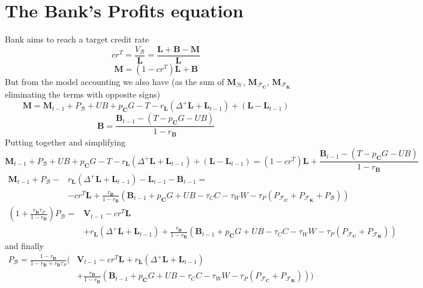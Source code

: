 \chapter{The Bank's Profits equation}
\label{app:eq}
Bank aims to reach a target credit rate
$${cr}^T = \frac{V_\mathcal{B}}{\mathbf{L}} = \frac{\mathbf{L} + \mathbf{B} - \mathbf{M}}{\mathbf{L}}$$
$$\mathbf{M} = (1-{cr}^T) \mathbf{L} + \mathbf{B}$$
But from the model accounting we also have (as the sum of $\mathbf{M}_\mathcal{H}$, $\mathbf{M}_{\mathcal{F}_\mathbf{C}}$, $\mathbf{M}_{\mathcal{F}_\mathbf{K}}$ eliminating the terms with opposite signs)
$$\mathbf{M} = \mathbf{M}_{t-1} + P_\mathcal{B} + UB + p_\mathbf{C} G - T -r_\mathbf{L}(\Delta^+\mathbf{L} + \mathbf{L}_{t-1}) + (\mathbf{L} - \mathbf{L}_{t-1})$$
$$\mathbf{B} = \frac{\mathbf{B}_{t-1} - (T - p_\mathbf{C}G - UB)}{1-r_\mathbf{B}}$$
Putting together and simplifying
$$\mathbf{M}_{t-1} + P_\mathcal{B} + UB + p_\mathbf{C} G - T -r_\mathbf{L}(\Delta^+\mathbf{L} + \mathbf{L}_{t-1}) + (\mathbf{L} - \mathbf{L}_{t-1}) = (1-{cr}^T) \mathbf{L} + \frac{\mathbf{B}_{t-1} - (T - p_\mathbf{C}G - UB)}{1-r_\mathbf{B}}$$
\begin{align*}
    \mathbf{M}_{t-1} + P_\mathcal{B} - & r_\mathbf{L} (\Delta^+\mathbf{L} + \mathbf{L}_{t-1}) - \mathbf{L}_{t-1} - \mathbf{B}_{t-1} =                                                                                                               \\
                                       & - {cr}^T \mathbf{L} + \frac{r_\mathbf{B}}{1-r_\mathbf{B}}(\mathbf{B}_{t-1} + p_\mathbf{C} G + UB - \tau_C C - \tau_W W - \tau_P (P_{\mathcal{F}_\mathbf{C}} + P_{\mathcal{F}_\mathbf{K}} + P_\mathcal{B}))
\end{align*}
\begin{align*}
    (1+\frac{r_\mathbf{B} \tau_P}{1-r_\mathbf{B}}) P_\mathcal{B}  = & \mathbf{V}_{t-1} - {cr}^T \mathbf{L}                                                                                                                                                                                          \\
                                                                    & + r_\mathbf{L} (\Delta^+\mathbf{L} + \mathbf{L}_{t-1}) + \frac{r_\mathbf{B}}{1-r_\mathbf{B}}(\mathbf{B}_{t-1} + p_\mathbf{C} G + UB - \tau_C C - \tau_W W - \tau_P (P_{\mathcal{F}_\mathbf{C}} + P_{\mathcal{F}_\mathbf{K}}))
\end{align*}
and finally
\begin{align*}
    P_\mathcal{B}  = \frac{1-r_\mathbf{B}}{1-r_\mathbf{B}+r_\mathbf{B}\tau_P}( & \mathbf{V}_{t-1} - {cr}^T \mathbf{L} + r_\mathbf{L} (\Delta^+\mathbf{L} + \mathbf{L}_{t-1})                                                                             \\
                                                                               & + \frac{r_\mathbf{B}}{1-r_\mathbf{B}}(\mathbf{B}_{t-1} + p_\mathbf{C} G + UB - \tau_C C - \tau_W W - \tau_P (P_{\mathcal{F}_\mathbf{C}} + P_{\mathcal{F}_\mathbf{K}})))
\end{align*}